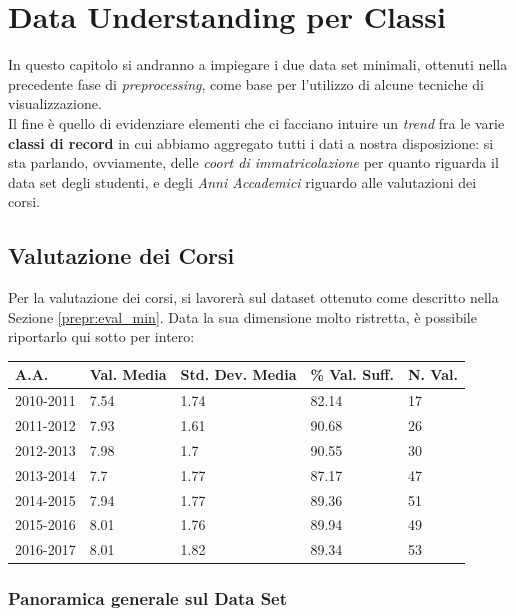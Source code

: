 \chapter{Data Understanding per Classi}
\label{ch:visual}

In questo capitolo si andranno a impiegare i due data set minimali, ottenuti nella precedente fase di \textit{preprocessing}, come base per l'utilizzo di alcune tecniche di visualizzazione. \\

Il fine è quello di evidenziare elementi che ci facciano intuire un \textit{trend} fra le varie \textbf{classi di record} in cui abbiamo aggregato tutti i dati a nostra disposizione: si sta parlando, ovviamente, delle \textit{coort di immatricolazione} per quanto riguarda il data set degli studenti, e degli \textit{Anni Accademici} riguardo alle valutazioni dei corsi.

\section{Valutazione dei Corsi}

Per la valutazione dei corsi, si lavorerà sul dataset ottenuto come descritto nella Sezione \ref{prepr:eval_min}. Data la sua dimensione molto ristretta, è possibile riportarlo qui sotto per intero:

\begin{table}[]
\begin{tabular}{lllll}
\hline
A.A. & Val. Media & Std. Dev. Media & \% Val. Suff. & N. Val. \\ \hline
2010-2011 & 7.54 & 1.74 & 82.14 & 17 \\
2011-2012 & 7.93 & 1.61 & 90.68 & 26 \\
2012-2013 & 7.98 & 1.7 & 90.55 & 30 \\
2013-2014 & 7.7 & 1.77 & 87.17 & 47 \\
2014-2015 & 7.94 & 1.77 & 89.36 & 51 \\
2015-2016 & 8.01 & 1.76 & 89.94 & 49 \\
2016-2017 & 8.01 & 1.82 & 89.34 & 53 \\ \hline
\end{tabular}
\end{table}

    \subsection{Panoramica generale sul Data Set}

